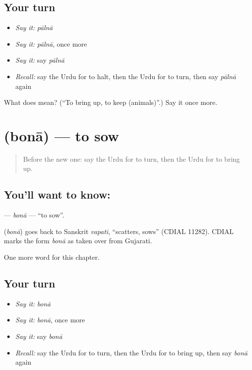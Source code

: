 \subsection*{Your turn}
\begin{itemize}
\raggedright
  \item \emph{Say it:} \emph{pālnā}
  \item \emph{Say it:} \emph{pālnā}, once more
  \item \emph{Say it:} say \emph{pālnā}
  \item \emph{Recall:} say the Urdu for to halt, then the Urdu for to turn, then say \emph{pālnā} again
\end{itemize}

\begin{tcolorbox}[breakable,colback=teal!4,colframe=teal!35!black,title={Before you move on}]
What does  mean? (\textquotedblleft{}To bring up, to keep (animals)\textquotedblright{}.) Say it once more.
\end{tcolorbox}
\section[\texorpdfstring{\ur{بونا} (bonā)}{بونا (bonā)}]{ (bonā) — to sow}

\label{lesson:UR-C241-bona}



\begin{quote}
Before the new one: say the Urdu for to turn, then the Urdu for to bring up.
\end{quote}

\subsection*{You'll want to know: }
\textbf{} — \emph{bonā} — \textquotedblleft{}to sow\textquotedblright{}.

\begin{cousinweb}
\textbf{} (\emph{bonā}) goes back to Sanskrit \emph{vapati}, \textquotedblleft{}scatters, sows\textquotedblright{} (CDIAL 11282). CDIAL marks the form \emph{bonā} as taken over from Gujarati.
\end{cousinweb}

\begin{grammarlens}[title={What you've built}]
One more word for this chapter.
\end{grammarlens}

\subsection*{Your turn}
\begin{itemize}
\raggedright
  \item \emph{Say it:} \emph{bonā}
  \item \emph{Say it:} \emph{bonā}, once more
  \item \emph{Say it:} say \emph{bonā}
  \item \emph{Recall:} say the Urdu for to turn, then the Urdu for to bring up, then say \emph{bonā} again
\end{itemize}

